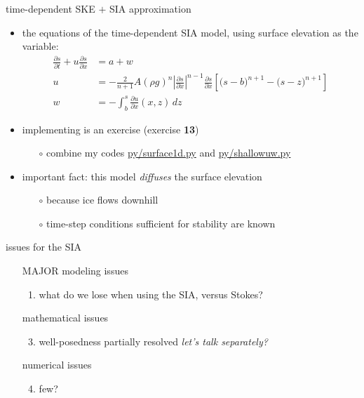 \documentclass[10pt,dvipsnames]{beamer}
\newcommand{\comm}[1]{{\footnotesize \hfill \emph{#1}}}
\begin{document}
\begin{frame}{time-dependent SKE $+$ SIA approximation}

\begin{itemize}
\item the equations of the \alert{time-dependent SIA model}, using surface elevation as the variable:
\begin{align*}
\frac{\partial s}{\partial t} + u \frac{\partial s}{\partial x} &= a + w \\
u &= - \frac{2}{n+1} A (\rho g)^n \left|\frac{\partial s}{\partial x}\right|^{n-1} \frac{\partial s}{\partial x} \left[\big(s - b\big)^{n+1} - \big(s-z\big)^{n+1}\right] \\
w &= - \int_{b}^{s} \frac{\partial u}{\partial x}(x,z)\,dz
\end{align*}
\item implementing is an exercise (exercise \textbf{13})
  \begin{itemize}
  \item[$\circ$] combine my codes \href{https://github.com/bueler/mccarthy/blob/master/py/surace1d.py}{py/surface1d.py} and \href{https://github.com/bueler/mccarthy/blob/master/py/shallowuw.py}{py/shallowuw.py}
  \end{itemize}
\item important fact: \alert{this model \emph{diffuses} the surface elevation}
  \begin{itemize}
  \item[$\circ$] because ice flows downhill
  \item[$\circ$] time-step conditions sufficient for stability are known
  \end{itemize}
\end{itemize}
\end{frame}


\begin{frame}{issues for the SIA}
\begin{itemize}
\item[] \alert{MAJOR modeling issues}
    \begin{enumerate}
    \item what do we lose when using the SIA, versus Stokes?
    \end{enumerate}
\item[] \alert{mathematical issues}
    \begin{enumerate}\setcounter{enumi}{2}
    \item well-posedness partially resolved \comm{let's talk separately?}
    \end{enumerate}
\item[] \alert{numerical issues}
    \begin{enumerate}\setcounter{enumi}{3}
    \item few?
    \end{enumerate}
\end{itemize}
\end{frame}
\end{document}
